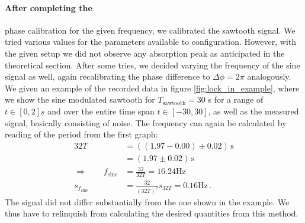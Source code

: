 \paragraph{After completing the} 
phase calibration for the given frequency, we calibrated the 
sawtooth signal. We tried various values for the parameters available to configuration. 
However, with the given setup we did not observe any absorption peak as anticipated in the 
theoretical section. After some tries, we decided varying the frequency of the sine signal as 
well, again recalibrating the phase difference to $\Delta \phi = 2 \pi$ analogously.  
We given an example of the recorded data in figure \ref{fig:lock_in_example}, where we show 
the sine modulated sawtooth for $T_\mathrm{sawtooth} = 30$ s for a range of $t \in [0, 2] s$ and
over the entire time span $t \in [-30, 30]$, as well as 
the measured signal, basically consisting of noise. The frequency can again be calculated 
by reading of the period from the first graph:
\begin{align}
    32T  &= \left((1.97 - 0.00) \pm 0.02\right) \, \mathrm{s} \\
        &= (1.97 \pm 0.02) \, \mathrm{s} \\
    \Rightarrow \qquad f_\mathrm{sine} &= \frac{32}{32T} = 16.24 \mathrm{Hz} \\
    s_{f_\mathrm{sine}} &= \frac{32}{(32T)^2} s_{32T} = 0.16 \mathrm{Hz} \, .
\end{align}
The signal did not differ substantially from the one shown in the example. We thus have to 
relinquish from calculating the desired quantities from this method. 

\FloatBarrier
